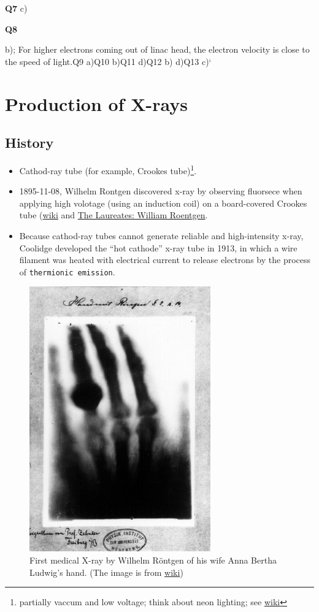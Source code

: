 \documentclass[]{book}
\providecommand{\tightlist}{%
  \setlength{\itemsep}{0pt}\setlength{\parskip}{0pt}}
\let\rmarkdownfootnote\footnote%
\def\footnote{\protect\rmarkdownfootnote}
\theoremstyle{definition}
\theoremstyle{definition}
\theoremstyle{definition}
\theoremstyle{remark}
\begin{document}
\textbf{Q7} c)

\textbf{Q8}

b); For higher electrons coming out of linac head, the electron velocity
is close to the speed of light.\texttt{}Q9 a)\texttt{}Q10 b)\texttt{}Q11
d)\texttt{}Q12 b) d)\texttt{}Q13 c)`

\chapter{Production of X-rays}\label{prox}

\section{History}\label{history}

\begin{itemize}
\tightlist
\item
  Cathod-ray tube (for example, Crookes tube)\footnote{partially vaccum
    and low voltage; think about neon lighting; see
    \href{https://en.wikipedia.org/wiki/Crookes_tube}{wiki}}.
\item
  1895-11-08, Wilhelm Rontgen discovered x-ray by observing fluorsece
  when applying high volotage (using an induction coil) on a
  board-covered Crookes tube
  (\href{https://en.wikipedia.org/wiki/Wilhelm_Röntgen}{wiki} and
  \href{https://www.youtube.com/watch?v=qVn3mgt8Two}{The Laureates:
  William Roentgen}.
\item
  Because cathod-ray tubes cannot generate reliable and high-intensity
  x-ray, Coolidge developed the ``hot cathode'' x-ray tube in 1913, in
  which a wire filament was heated with electrical current to release
  electrons by the process of \texttt{thermionic\ emission}.
\end{itemize}

\begin{figure}
\centering
\includegraphics{figures/x-ray_hand.jpg}
\caption{First medical X-ray by Wilhelm Röntgen of his wife Anna Bertha
Ludwig's hand. (The image is from
\href{https://en.wikipedia.org/wiki/Wilhelm_Röntgen}{wiki})}
\end{figure}
\end{document}
